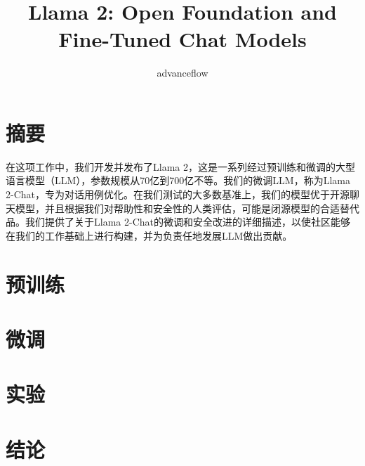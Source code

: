 \documentclass[lang=cn,a4paper]{paper}
\title{Llama 2: Open Foundation and Fine-Tuned Chat Models}
\author{advanceflow}
\begin{document}
\maketitle

\begin{abstract}

\end{abstract}

\section{摘要}
在这项工作中，我们开发并发布了Llama 2，这是一系列经过预训练和微调的大型语言模型（LLM），参数规模从70亿到700亿不等。我们的微调LLM，称为Llama 2-Chat，专为对话用例优化。在我们测试的大多数基准上，我们的模型优于开源聊天模型，并且根据我们对帮助性和安全性的人类评估，可能是闭源模型的合适替代品。我们提供了关于Llama 2-Chat的微调和安全改进的详细描述，以使社区能够在我们的工作基础上进行构建，并为负责任地发展LLM做出贡献。
\section{预训练}
\section{微调}
\section{实验}
\section{结论}


\printbibliography

\end{document}
